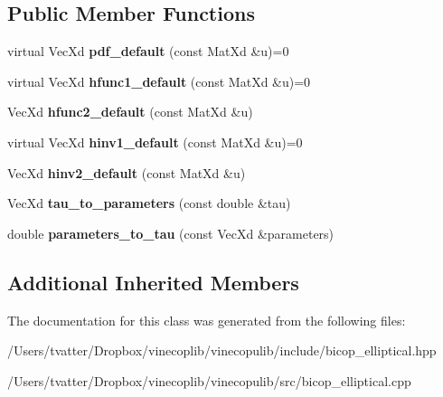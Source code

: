 \subsection*{Public Member Functions}
\begin{DoxyCompactItemize}
\item 
\mbox{\label{class_elliptical_bicop_a9d859278685c80465d09dc8fe05b7d3d}} 
virtual Vec\+Xd {\bfseries pdf\+\_\+default} (const Mat\+Xd \&u)=0
\item 
\mbox{\label{class_elliptical_bicop_ae4e47a0b9373b0f103b28fbacdaa58b8}} 
virtual Vec\+Xd {\bfseries hfunc1\+\_\+default} (const Mat\+Xd \&u)=0
\item 
\mbox{\label{class_elliptical_bicop_a18f5fa85bd6ed14d56e0b269c091ac3b}} 
Vec\+Xd {\bfseries hfunc2\+\_\+default} (const Mat\+Xd \&u)
\item 
\mbox{\label{class_elliptical_bicop_aa2a3700bc5dd43aade311985f96077e0}} 
virtual Vec\+Xd {\bfseries hinv1\+\_\+default} (const Mat\+Xd \&u)=0
\item 
\mbox{\label{class_elliptical_bicop_ac94477889cbd73c30eb7010001e9fec8}} 
Vec\+Xd {\bfseries hinv2\+\_\+default} (const Mat\+Xd \&u)
\item 
\mbox{\label{class_elliptical_bicop_a4a478ff32dddf4561c8d97041b943e1f}} 
Vec\+Xd {\bfseries tau\+\_\+to\+\_\+parameters} (const double \&tau)
\item 
\mbox{\label{class_elliptical_bicop_a45f034c75af02d9b20b4af5c16754e5a}} 
double {\bfseries parameters\+\_\+to\+\_\+tau} (const Vec\+Xd \&parameters)
\end{DoxyCompactItemize}
\subsection*{Additional Inherited Members}


The documentation for this class was generated from the following files\+:\begin{DoxyCompactItemize}
\item 
/\+Users/tvatter/\+Dropbox/vinecoplib/vinecopulib/include/bicop\+\_\+elliptical.\+hpp\item 
/\+Users/tvatter/\+Dropbox/vinecoplib/vinecopulib/src/bicop\+\_\+elliptical.\+cpp\end{DoxyCompactItemize}
